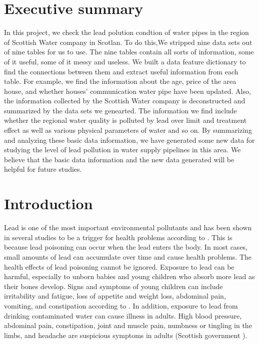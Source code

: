 \documentclass[11pt,twoside]{article}
\numberwithin{Theorem}{section}
\numberwithin{Definition}{section}
\numberwithin{Lemma}{section}
\numberwithin{Algorithm}{section}
\numberwithin{equation}{section}
\begin{document}
\cleardoublepage

\setcounter{page}{1}


\clearpage

\section*{Executive summary}
\label{sec.summary}
In this project, we check the lead polution condtion of water pipes in the region of Scottish Water company in Scotlan. To do this,We stripped nine data sets out of nine tables for us to use. The nine tables contain all sorts of information, some of it useful, some of it messy and useless. We built a data feature dictionary to find the connections between them and extract useful information from each table. For example, we find the information about the age, price of the area house, and whether houses' communication water pipe have been updated. Also, the information collected by the Scottish Water company is deconstructed and summarized by the data sets we genearted. The information we find include whether the regional water quality is polluted by lead over limit and treatment effect as well as various physical parameters of water and so on. By summarizing and analyzing these basic data information, we have generated some new data for studying the level of lead pollution in water supply pipelines in this area. We believe that the basic data information and the new data generated will be helpful for future studies.

\clearpage

\section{Introduction}
\label{sec.intro}
Lead is one of the most important environmental pollutants and has been shown in several studies to be a trigger for health problems according to \cite{ei}. This is because lead poisoning can occur when the lead enters the body. In most cases, small amounts of lead can accumulate over time and cause health problems. The health effects of lead poisoning cannot be ignored. Exposure to lead can be harmful, especially to unborn babies and young children who absorb more lead as their bones develop. Signs and symptoms of young children can include irritability and fatigue, loss of appetite and weight loss, abdominal pain, vomiting, and constipation according to \cite{stacy}. In addition, exposure to lead from drinking contaminated water can cause illness in adults. High blood pressure, abdominal pain, constipation, joint and muscle pain, numbness or tingling in the limbs, and headache are suspicious symptoms in adults (Scottish government \citeyear{government}).
\end{document}
